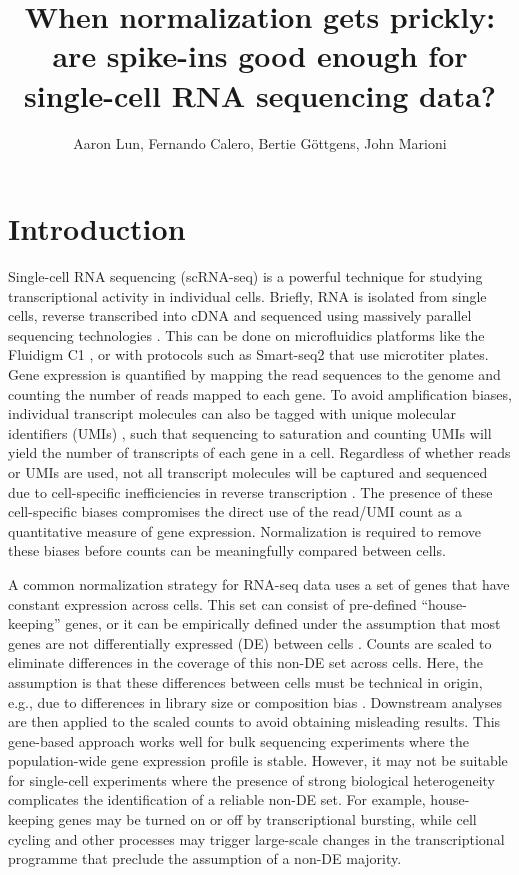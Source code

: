 \documentclass{article}
\title{When normalization gets prickly: are spike-ins good enough for single-cell RNA sequencing data?}
\author{Aaron Lun, Fernando Calero, Bertie G\"ottgens, John Marioni}
\begin{document}
\maketitle

\section{Introduction}
Single-cell RNA sequencing (scRNA-seq) is a powerful technique for studying transcriptional activity in individual cells.
Briefly, RNA is isolated from single cells, reverse transcribed into cDNA and sequenced using massively parallel sequencing technologies \cite{shapiro2013singlecell}.
This can be done on microfluidics platforms like the Fluidigm C1 \cite{pollen2014lowcoverage}, or with protocols such as Smart-seq2 \cite{picelli2014full} that use microtiter plates.
Gene expression is quantified by mapping the read sequences to the genome and counting the number of reads mapped to each gene.
To avoid amplification biases, individual transcript molecules can also be tagged with unique molecular identifiers (UMIs) \cite{islam2014quantitative}, such that sequencing to saturation and counting UMIs will yield the number of transcripts of each gene in a cell.
Regardless of whether reads or UMIs are used, not all transcript molecules will be captured and sequenced due to cell-specific inefficiencies in reverse transcription \cite{stegle2015computational}.
The presence of these cell-specific biases compromises the direct use of the read/UMI count as a quantitative measure of gene expression.
Normalization is required to remove these biases before counts can be meaningfully compared between cells.

A common normalization strategy for RNA-seq data uses a set of genes that have constant expression across cells.
This set can consist of pre-defined ``house-keeping'' genes, or it can be empirically defined under the assumption that most genes are not differentially expressed (DE) between cells \cite{lun2016pooling,anders2010differential,robinson2010tmm}.
Counts are scaled to eliminate differences in the coverage of this non-DE set across cells.
Here, the assumption is that these differences between cells must be technical in origin, e.g., due to differences in library size or composition bias \cite{robinson2010tmm}.
Downstream analyses are then applied to the scaled counts to avoid obtaining misleading results.
This gene-based approach works well for bulk sequencing experiments where the population-wide gene expression profile is stable.
However, it may not be suitable for single-cell experiments where the presence of strong biological heterogeneity complicates the identification of a reliable non-DE set. 
For example, house-keeping genes may be turned on or off by transcriptional bursting, while cell cycling and other processes may trigger large-scale changes in the transcriptional programme that preclude the assumption of a non-DE majority.
\end{document}
